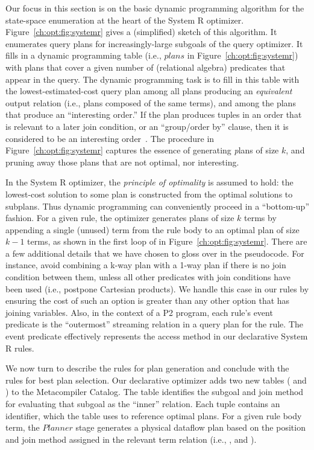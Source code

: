 Our focus in this section is on the basic dynamic programming algorithm for the
state-space enumeration at the heart of the System R optimizer.
Figure~\ref{ch:opt:fig:systemr} gives a (simplified) sketch of this algorithm.
It enumerates query plans for increasingly-large subgoals of the query
optimizer.  It fills in a dynamic programming table (i.e., $plans$ in
Figure~\ref{ch:opt:fig:systemr}) with plans that cover a given number of
(relational algebra) predicates that appear in the query.  The dynamic
programming task is to fill in this table with the lowest-estimated-cost query
plan among all plans producing an {\em equivalent} output relation (i.e., plans
composed of the same terms), and among the plans that produce an ``interesting
order.'' If the plan produces tuples in an order that is relevant to a later
join condition, or an ``group/order by'' clause, then it is considered to be an
interesting order~\cite{selinger}.  The  procedure in
Figure~\ref{ch:opt:fig:systemr} captures the essence of generating {\emph
plans} of size $k$, and pruning away those plans that are not optimal, nor
interesting.

In the System R optimizer, the {\em principle of optimality} is assumed to
hold: the lowest-cost solution to some plan is constructed from the optimal
solutions to subplans.  Thus dynamic programming can conveniently proceed in a
``bottom-up'' fashion.  For a given rule, the optimizer generates plans of size
$k$ terms by appending a single (unused) term from the rule body to an optimal
plan of size $k-1$ terms, as shown in the first loop of  in
Figure~\ref{ch:opt:fig:systemr}.  There are a few additional details that we
have chosen to gloss over in the pseudocode.  For instance, avoid combining a
k-way plan with a 1-way plan if there is no join condition between them, unless
all other predicates with join conditions have been used (i.e., postpone
Cartesian products).  We handle this case in our \OVERLOG rules by ensuring the
cost of such an option is greater than any other option that has joining
variables.  Also, in the context of a P2 program, each rule's event predicate
is the ``outermost'' streaming relation in a query plan for the rule.  The
event predicate effectively represents the access method in our declarative
System R rules.

We now turn to describe the \OVERLOG rules for plan generation and conclude
with the rules for best plan selection.  Our declarative optimizer adds two new
tables ( and ) to the Metacompiler Catalog.  The
 table identifies the subgoal and join method for evaluating that
subgoal as the ``inner'' relation.  Each  tuple contains an
identifier, which the  table uses to reference optimal plans.  For
a given rule body term, the $Planner$ stage generates a physical dataflow plan
based on the position and join method assigned in the relevant term relation
(i.e., ,  and ).

